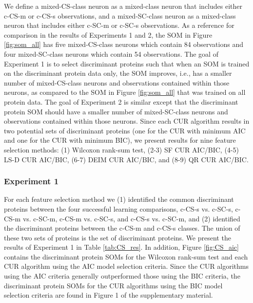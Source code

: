 \documentclass[12pt]{article}
\begin{document}
We define a mixed-CS-class neuron as a mixed-class neuron that includes either c-CS-m or c-CS-s observations, and a mixed-SC-class neuron as a mixed-class neuron that includes either c-SC-m or c-SC-s observations. As a reference for comparison in the results of Experiments 1 and 2, the SOM in Figure \ref{fig:som_all} has five mixed-CS-class neurons which contain 84 observations and four mixed-SC-class neurons which contain 54 observations.  The goal of Experiment 1 is to select discriminant proteins such that when an SOM is trained on the discriminant protein data only, the SOM improves, i.e., has a smaller number of mixed-CS-class neurons and observations contained within those neurons, as compared to the SOM in Figure \ref{fig:som_all} that was trained on all protein data.  The goal of Experiment 2 is similar except that the discriminant protein SOM should have a smaller number of mixed-SC-class neurons and observations contained within those neurons.  Since each CUR algorithm results in two potential sets of discriminant proteins (one for the CUR with minimum AIC and one for the CUR with minimum BIC), we present results for nine feature selection methods: (1) Wilcoxon rank-sum test, (2-3) SF CUR AIC/BIC, (4-5) LS-D CUR AIC/BIC, (6-7) DEIM CUR AIC/BIC, and (8-9) QR CUR AIC/BIC.  

\subsubsection{Experiment 1}

For each feature selection method we (1) identified the common discriminant proteins between the four successful learning comparisons, c-CS-s vs. c-SC-s, c-CS-m vs. c-SC-m, c-CS-m vs. c-SC-s, and c-CS-s vs. c-SC-m, and (2) identified the discriminant proteins between the c-CS-m and c-CS-s classes. The union of these two sets of proteins is the set of discriminant proteins.  We present the results of Experiment 1 in Table \ref{tab:CS_res}. In addition, Figure \ref{fig:CS_aic} contains the discriminant protein SOMs for the Wilcoxon rank-sum test and each CUR algorithm using the AIC model selection criteria.  Since the CUR algorithms using the AIC criteria generally outperformed those using the BIC criteria, the discriminant protein SOMs for the CUR algorithms using the BIC model selection criteria are found in Figure 1 of the supplementary material. 
\end{document}
